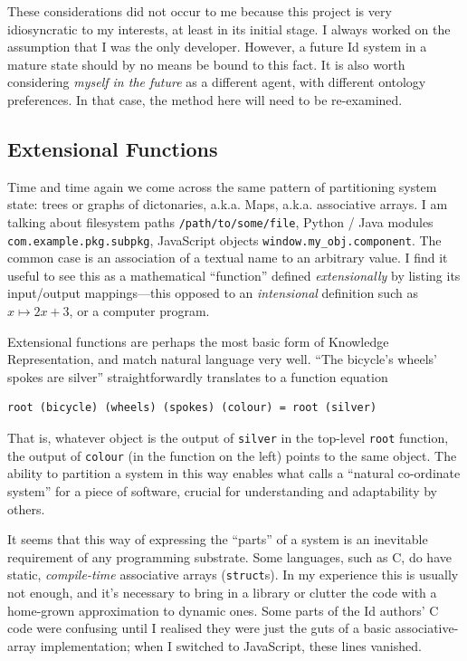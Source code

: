 These considerations did not occur to me because this project is very
idiosyncratic to my interests, at least in its initial stage. I always
worked on the assumption that I was the only developer. However, a
future Id{} system in a mature state should by no means be bound to this
fact. It is also worth considering \emph{myself in the future} as a
different agent, with different ontology preferences. In that case, the
method here will need to be re-examined.

\hypertarget{extensional-functions}{%
\subsection{Extensional Functions}\label{extensional-functions}}

Time and time again we come across the same pattern of partitioning
system state: trees or graphs of dictonaries, a.k.a. Maps, a.k.a.
associative arrays. I am talking about filesystem paths
\texttt{/path/to/some/file}, Python / Java modules
\texttt{com.example.pkg.subpkg}, JavaScript objects
\texttt{window.my\_obj.component}. The common case is an association of
a textual name to an arbitrary value. I find it useful to see this as a
mathematical ``function'' defined \emph{extensionally} by listing its
input/output mappings---this opposed to an \emph{intensional} definition
such as \(x \mapsto 2x+3\), or a computer program.

Extensional functions are perhaps the most basic form of Knowledge
Representation, and match natural language very well. ``The bicycle's
wheels' spokes are silver'' straightforwardly translates to a function
equation

\begin{lstlisting}
root (bicycle) (wheels) (spokes) (colour) = root (silver)
\end{lstlisting}

That is, whatever object is the output of \texttt{silver} in the
top-level \texttt{root} function, the output of \texttt{colour} (in the
function on the left) points to the same object. The ability to
partition a system in this way enables what \cite{externalise} calls a
``natural co-ordinate system'' for a piece of software, crucial for
understanding and adaptability by others.

It seems that this way of expressing the ``parts'' of a system is an
inevitable requirement of any programming substrate. Some languages,
such as C, do have static, \emph{compile-time} associative arrays
(\texttt{struct}s). In my experience this is usually not enough, and
it's necessary to bring in a library or clutter the code with a
home-grown approximation to dynamic ones. Some parts of the Id{}
authors' C code were confusing until I realised they were just the guts
of a basic associative-array implementation; when I switched to
JavaScript, these lines vanished.

